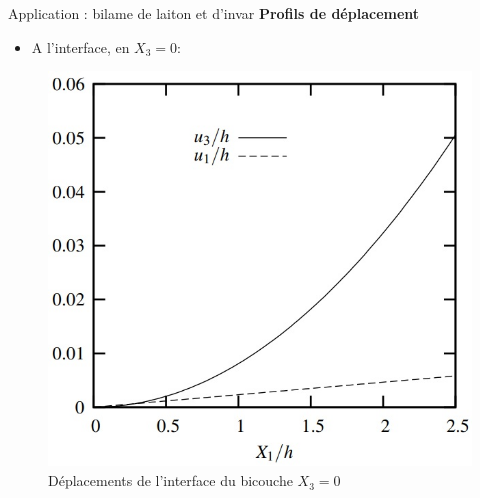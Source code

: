 \documentclass{beamer}
\begin{document}
\begin{frame}{Application : bilame de laiton et d'invar}
    \textbf{\Large{Profils de déplacement}}
    
    \begin{itemize}
        \item A l'interface, en $X_3=0$:
    \end{itemize}
    \begin{figure}
        \centering
        \includegraphics[scale=0.5]{imgs/graph1.jpg}
        \caption{Déplacements de l'interface du bicouche $X_3=0$}
    \end{figure}
\end{frame}
\end{document}
